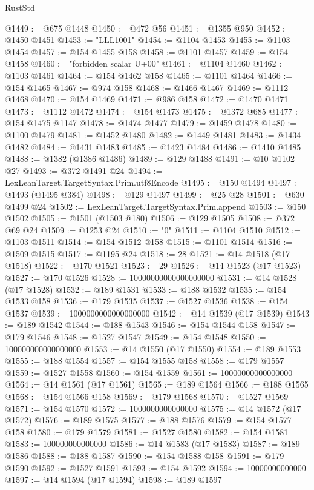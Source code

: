 \begin{lexlean}{RustStd}
\begin{coremodule}
@1449 := @675 @1448
@1450 := @472 @56
@1451 := @1355 @950
@1452 := @1450 @1451
@1453 := "LLL1001"
@1454 := @1104 @1453
@1455 := @1103 @1454
@1457 := @154 @1455 @158
@1458 := @1101 @1457
@1459 := @154 @1458
@1460 := "forbidden scalar U+00"
@1461 := @1104 @1460
@1462 := @1103 @1461
@1464 := @154 @1462 @158
@1465 := @1101 @1464
@1466 := @154 @1465
@1467 := @974 @158
@1468 := @1466 @1467
@1469 := @1112 @1468
@1470 := @154 @1469
@1471 := @986 @158
@1472 := @1470 @1471
@1473 := @1112 @1472
@1474 := @154 @1473
@1475 := @1372 @685
@1477 := @154 @1475 @1147
@1478 := @1474 @1477
@1479 := @1459 @1478
@1480 := @1100 @1479
@1481 := @1452 @1480
@1482 := @1449 @1481
@1483 := @1434 @1482
@1484 := @1431 @1483
@1485 := @1423 @1484
@1486 := @1410 @1485
@1488 := @1382 (@1386 @1486)
@1489 := @129 @1488
@1491 := @10 @1102 @27
@1493 := @372 @1491 @24
@1494 := LexLeanTarget.TargetSyntax.Prim.utf8Encode
@1495 := @150 @1494
@1497 := @1493 (@1495 @384)
@1498 := @129 @1497
@1499 := @25 @28
@1501 := @630 @1499 @24
@1502 := LexLeanTarget.TargetSyntax.Prim.append
@1503 := @150 @1502
@1505 := @1501 (@1503 @180)
@1506 := @129 @1505
@1508 := @372 @69 @24
@1509 := @1253 @24
@1510 := "0"
@1511 := @1104 @1510
@1512 := @1103 @1511
@1514 := @154 @1512 @158
@1515 := @1101 @1514
@1516 := @1509 @1515
@1517 := @1195 @24
@1518 := 28
@1521 := @14 @1518 (@17 @1518)
@1522 := @170 @1521
@1523 := 29
@1526 := @14 @1523 (@17 @1523)
@1527 := @170 @1526
@1528 := 10000000000000000000
@1531 := @14 @1528 (@17 @1528)
@1532 := @189 @1531
@1533 := @188 @1532
@1535 := @154 @1533 @158
@1536 := @179 @1535
@1537 := @1527 @1536
@1538 := @154 @1537
@1539 := 1000000000000000000
@1542 := @14 @1539 (@17 @1539)
@1543 := @189 @1542
@1544 := @188 @1543
@1546 := @154 @1544 @158
@1547 := @179 @1546
@1548 := @1527 @1547
@1549 := @154 @1548
@1550 := 100000000000000000
@1553 := @14 @1550 (@17 @1550)
@1554 := @189 @1553
@1555 := @188 @1554
@1557 := @154 @1555 @158
@1558 := @179 @1557
@1559 := @1527 @1558
@1560 := @154 @1559
@1561 := 10000000000000000
@1564 := @14 @1561 (@17 @1561)
@1565 := @189 @1564
@1566 := @188 @1565
@1568 := @154 @1566 @158
@1569 := @179 @1568
@1570 := @1527 @1569
@1571 := @154 @1570
@1572 := 1000000000000000
@1575 := @14 @1572 (@17 @1572)
@1576 := @189 @1575
@1577 := @188 @1576
@1579 := @154 @1577 @158
@1580 := @179 @1579
@1581 := @1527 @1580
@1582 := @154 @1581
@1583 := 100000000000000
@1586 := @14 @1583 (@17 @1583)
@1587 := @189 @1586
@1588 := @188 @1587
@1590 := @154 @1588 @158
@1591 := @179 @1590
@1592 := @1527 @1591
@1593 := @154 @1592
@1594 := 10000000000000
@1597 := @14 @1594 (@17 @1594)
@1598 := @189 @1597

\end{coremodule}
\end{lexlean}
